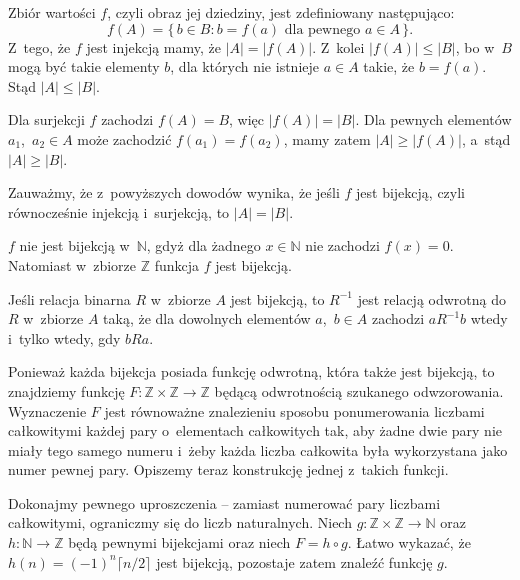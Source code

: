 \exercise %
\subexercise
Zbiór wartości $f$, czyli obraz jej dziedziny, jest zdefiniowany następująco:
\[
	f(A) = \bigl\{\,b\in B:b=f(a)\text{ dla pewnego $a\in A$}\,\bigr\}.
\]
Z~tego, że $f$ jest injekcją mamy, że $|A|=|f(A)|$. Z~kolei $|f(A)|\le|B|$, bo w~$B$ mogą być takie elementy $b$, dla których nie istnieje $a\in A$ takie, że $b=f(a)$. Stąd $|A|\le|B|$.

\subexercise
Dla surjekcji $f$ zachodzi $f(A)=B$, więc $|f(A)|=|B|$. Dla pewnych elementów $a_1$,~$a_2\in A$ może zachodzić $f(a_1)=f(a_2)$, mamy zatem $|A|\ge|f(A)|$, a~stąd $|A|\ge|B|$.
\bigskip

Zauważmy, że z~powyższych dowodów wynika, że jeśli $f$ jest bijekcją, czyli równocześnie injekcją i~surjekcją, to $|A|=|B|$.

\exercise %
$f$ nie jest bijekcją w~$\mathbb{N}$, gdyż dla żadnego $x\in\mathbb{N}$ nie zachodzi $f(x)=0$. Natomiast w~zbiorze $\mathbb{Z}$ funkcja $f$ jest bijekcją.

\exercise %
Jeśli relacja binarna $R$ w~zbiorze $A$ jest bijekcją, to $R^{-1}$ jest relacją odwrotną do $R$ w~zbiorze $A$ taką, że dla dowolnych elementów $a$,~$b\in A$ zachodzi $aR^{-1}b$ wtedy i~tylko wtedy, gdy $bRa$.

\exercise %
Ponieważ każda bijekcja posiada funkcję odwrotną, która także jest bijekcją, to znajdziemy funkcję $F\colon\mathbb{Z}\times\mathbb{Z}\to\mathbb{Z}$ będącą odwrotnością szukanego odwzorowania. Wyznaczenie $F$ jest równoważne znalezieniu sposobu ponumerowania liczbami całkowitymi każdej pary o~elementach całkowitych tak, aby żadne dwie pary nie miały tego samego numeru i~żeby każda liczba całkowita była wykorzystana jako numer pewnej pary. Opiszemy teraz konstrukcję jednej z~takich funkcji.

Dokonajmy pewnego uproszczenia -- zamiast numerować pary liczbami całkowitymi, ograniczmy się do liczb naturalnych. Niech $g\colon\mathbb{Z}\times\mathbb{Z}\to\mathbb{N}$ oraz $h\colon\mathbb{N}\to\mathbb{Z}$ będą pewnymi bijekcjami oraz niech $F=h\circ g$. Łatwo wykazać, że $h(n)=(-1)^n\lceil n/2\rceil$ jest bijekcją, pozostaje zatem znaleźć funkcję $g$.

